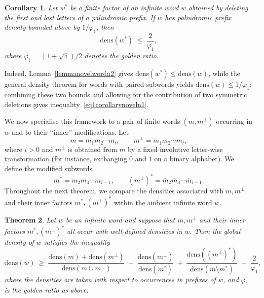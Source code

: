 \documentclass[12pt]{amsart}
\newtheorem{theorem}{Theorem}[section]
\newtheorem{corollary}[theorem]{Corollary}
\begin{document}
\begin{corollary}\label{corollarynoveln1}
Let $w^*$ be a finite factor of an infinite word $w$ obtained by deleting the first and last letters of a palindromic prefix. If $w$ has palindromic prefix density bounded above by $1/\varphi_1$, then
\begin{equation}\label{eq1corollarynoveln1}
\mathrm{dens}(w^*) \;\leqslant\; \frac{2}{\varphi_1},
\end{equation}
where $\varphi_1=(1+\sqrt{5})/2$ denotes the golden ratio.
\end{corollary}

\noindent
Indeed, Lemma~\ref{lemmanovelwordn2} gives $\mathrm{dens}(w^*)\le \mathrm{dens}(w)$, while the general density theorem for words with paired subwords yields $\mathrm{dens}(w)\le 1/\varphi_1$; combining these two bounds and allowing for the contribution of two symmetric deletions gives inequality~\eqref{eq1corollarynoveln1}.

We now specialise this framework to a pair of finite words $(m,m^{\perp})$ occurring in $w$ and to their “inner” modifications. Let
\begin{equation}\label{newordsn1}
m = m_1 m_2\cdots m_i, \qquad
m^{\perp} = \overline{m}_1 \overline{m}_2\cdots \overline{m}_i,
\end{equation}
where $i>0$ and $m^{\perp}$ is obtained from $m$ by a fixed involutive letter-wise transformation (for instance, exchanging $0$ and $1$ on a binary alphabet). We define the modified subwords
\[
m^{*} = m_2 m_3\cdots m_{i-1}, \qquad
(m^{\perp})^{*} = \overline{m}_2 \overline{m}_3\cdots \overline{m}_{i-1}.
\]
Throughout the next theorem, we compare the densities associated with $m,m^{\perp}$ and their inner factors $m^{*},(m^{\perp})^{*}$ within the ambient infinite word $w$.

\begin{theorem}\label{ThmDensityTypn1}
Let $w$ be an infinite word and suppose that $m,m^{\perp}$ and their inner factors $m^{*},(m^{\perp})^{*}$ all occur with well-defined densities in $w$. Then the global density of $w$ satisfies the inequality
\begin{equation}\label{eq1ThmDensityTypn1}
\mathrm{dens}(w)
\;\geqslant\;
\frac{\mathrm{dens}(m)+\mathrm{dens}(m^{\perp})}{\mathrm{dens}(m\cup m^{\perp})}
\;+\;
\frac{\mathrm{dens}(m^{\perp})}{\mathrm{dens}(m^{*})}
\;+\;
\frac{\mathrm{dens}((m^{\perp})^{*})}{\mathrm{dens}(m\setminus m^{*})}
\;-\;
\frac{2}{\varphi_1},
\end{equation}
where the densities are taken with respect to occurrences in prefixes of $w$, and $\varphi_1$ is the golden ratio as above.
\end{theorem}
\end{document}
